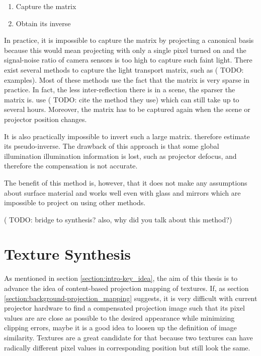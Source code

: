\begin{enumerate}
    \item Capture the matrix
    \item Obtain its inverse
\end{enumerate}

In practice, it is impossible to capture the matrix by projecting a canonical basis because this would mean projecting with only a single pixel turned on and the signal-noise ratio of camera sensors is too high to capture such faint light. There exist several methods to capture the light transport matrix, such as ({\color{red} TODO: examples}). Most of these methods use the fact that the matrix is very sparse in practice. In fact, the less inter-reflection there is in a scene, the sparser the matrix is. \citet{Wetzstein2007} use ({\color{red} TODO: cite the method they use}) which can still take up to several hours. Moreover, the matrix has to be captured again when the scene or projector position changes.

It is also practically impossible to invert such a large matrix. \citet{Wetzstein2007} therefore estimate its pseudo-inverse. The drawback of this approach is that some global illumination illumination information is lost, such as projector defocus, and therefore the compensation is not accurate.

The benefit of this method is, however, that it does not make any assumptions about surface material and works well even with glass and mirrors which are impossible to project on using other methods.

({\color{red} TODO: bridge to synthesis? also, why did you talk about this method?})

\section{Texture Synthesis}
\label{section:background-texture_synthesis}

As mentioned in section \ref{section:intro-key_idea}, the aim of this thesis is to advance the idea of content-based projection mapping of textures. If, as section \ref{section:background-projection_mapping} suggests, it is very difficult with current projector hardware to find a compensated projection image such that its pixel values are are close as possible to the desired appearance while minimizing clipping errors, maybe it is a good idea to loosen up the definition of image similarity. Textures are a great candidate for that because two textures can have radically different pixel values in corresponding position but still look the same.

